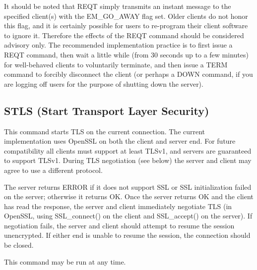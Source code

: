 It should be noted that REQT simply transmits an instant message to the
specified client(s) with the EM_GO_AWAY flag set.  Older clients do not honor
this flag, and it is certainly possible for users to re-program their client
software to ignore it.  Therefore the effects of the REQT command should be
considered advisory only.  The recommended implementation practice is to first
issue a REQT command, then wait a little while (from 30 seconds up to a few
minutes) for well-behaved clients to voluntarily terminate, and then issue a
TERM command to forcibly disconnect the client (or perhaps a DOWN command, if
you are logging off users for the purpose of shutting down the server).



\subsection{STLS (Start Transport Layer Security)}

 This command starts TLS on the current connection.  The current
implementation uses OpenSSL on both the client and server end.  For future
compatibility all clients must support at least TLSv1, and servers are
guaranteed to support TLSv1.  During TLS negotiation (see below) the server
and client may agree to use a different protocol.

 The server returns ERROR if it does not support SSL or SSL initialization
failed on the server; otherwise it returns OK.  Once the server returns OK and
the client has read the response, the server and client immediately negotiate
TLS (in OpenSSL, using SSL_connect() on the client and SSL_accept() on the
server).  If negotiation fails, the server and client should attempt to resume
the session unencrypted.  If either end is unable to resume the session, the
connection should be closed.

 This command may be run at any time.


